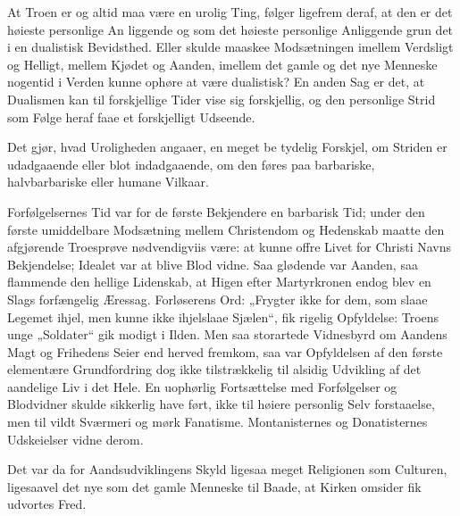 \documentclass[12pt]{book}
\newcommand{\opage}[1]{\marginnote{\footnotesize\textit{[#1]}}}
\begin{document}
At Troen er og altid maa være en urolig Ting,
følger ligefrem deraf, at den er det høieste personlige An\-%
liggende og som det høieste personlige Anliggende grun\-%
det i en dualistisk Bevidsthed. Eller skulde maaskee
Modsætningen imellem Verdsligt og Helligt, mellem Kjødet
og Aanden, imellem det gamle og det nye Menneske
nogentid i Verden kunne ophøre at være dualistisk? En
\opage{258}\setcounter{footnote}{0}%
anden Sag er det, at Dualismen kan til forskjellige Tider
vise sig forskjellig, og den personlige Strid som Følge
heraf faae et forskjelligt Udseende.

Det gjør, hvad Uroligheden angaaer, en meget be\-%
tydelig Forskjel, om Striden er udadgaaende eller blot
indadgaaende, om den føres paa barbariske, halvbarbariske
eller humane Vilkaar.

Forfølgelsernes Tid var for de første Bekjendere en
barbarisk Tid; under den første umiddelbare Modsætning
mellem Christendom og Hedenskab maatte den afgjørende
Troesprøve nødvendigviis være: at kunne offre Livet for
Christi Navns Bekjendelse; Idealet var at blive Blod\-%
vidne. Saa glødende var Aanden, saa flammende den
hellige Lidenskab, at Higen efter Martyrkronen endog
blev en Slags forfængelig Æressag. Forløserens Ord:
„Frygter ikke for dem, som slaae Legemet ihjel, men
kunne ikke ihjelslaae Sjælen“, fik rigelig Opfyldelse:
Troens unge „Soldater“ gik modigt i Ilden. Men saa
storartede Vidnesbyrd om Aandens Magt og Frihedens
Seier end herved fremkom, saa var Opfyldelsen af den
første elementære Grundfordring dog ikke tilstrækkelig til
alsidig Udvikling af det aandelige Liv i det Hele. En
uophørlig Fortsættelse med Forfølgelser og Blodvidner
skulde sikkerlig have ført, ikke til høiere personlig Selv\-%
forstaaelse, men til vildt Sværmeri og mørk Fanatisme.
Montanisternes og Donatisternes Udskeielser vidne derom.

Det var da for Aandsudviklingens Skyld ligesaa\-%
meget Religionen som Culturen, ligesaavel det nye som
det gamle Menneske til Baade, at Kirken omsider fik
udvortes Fred.
\end{document}
